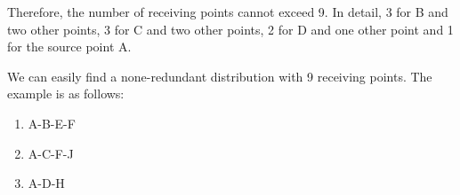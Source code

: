\documentclass{mcmthesis}
\begin{document}
Therefore, the number of receiving points cannot exceed 9. In detail, 3 for B and two other points, 3 for C and two other points, 2 for D and one other point and 1 for the source point A.

We can easily find a none-redundant distribution with 9 receiving points. The example is as follows:






\begin{enumerate}[ \quad(1).]
\item A-B-E-F
\item A-C-F-J
\item A-D-H
\end{enumerate}




\end{document}
